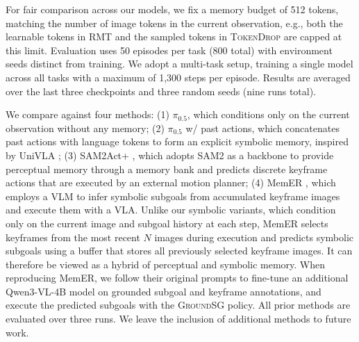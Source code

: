 For fair comparison across our \modelname\xspace models, we fix a memory budget of 512 tokens, matching the number of image tokens in the current observation, e.g., both the learnable tokens in \textsc{RMT} and the sampled tokens in \textsc{TokenDrop} are capped at this limit. 
Evaluation uses 50 episodes per task (800 total) with environment seeds distinct from training. We adopt a multi-task setup, training a single model across all tasks with a maximum of 1,300 steps per episode. Results are averaged over the last three checkpoints and three random seeds (nine runs total).

We compare against four methods:
(1) $\pi_{0.5}$, which conditions only on the current observation without any memory;
(2) $\pi_{0.5}$ w/ past actions, which concatenates past actions with language tokens to form an explicit symbolic memory, inspired by UniVLA \cite{bu2025learning};
(3) SAM2Act+ \cite{fang2025sam2act}, which adopts SAM2 as a backbone to provide perceptual memory through a memory bank and predicts discrete keyframe actions that are executed by an external motion planner; 
(4) MemER \cite{sridhar2025memer}, which employs a VLM to infer symbolic subgoals from accumulated keyframe images and execute them with a VLA.
Unlike our symbolic variants, which condition only on the current image and subgoal history at each step, MemER selects keyframes from the most recent $N$ images during execution and predicts symbolic subgoals using a buffer that stores all previously selected keyframe images. It can therefore be viewed as a hybrid of perceptual and symbolic memory. When reproducing MemER, we follow their original prompts to fine-tune an additional Qwen3-VL-4B model on grounded subgoal and keyframe annotations, and execute the predicted subgoals with the \textsc{GroundSG} policy.
All prior methods are evaluated over three runs. We leave the inclusion of additional methods to future work.




